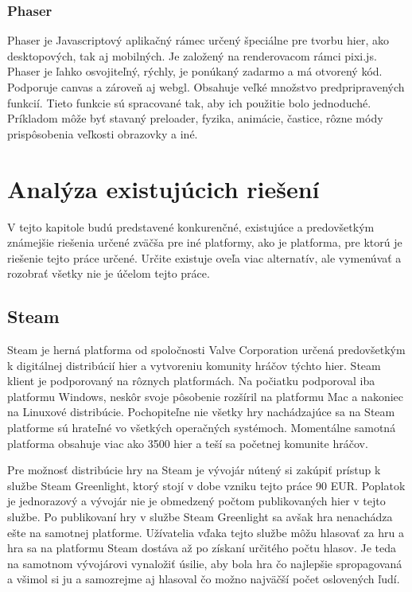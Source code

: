 \subsection{Phaser}
\label{sec:phaser}
Phaser je Javascriptový aplikačný rámec určený špeciálne pre tvorbu hier, ako desktopových, tak aj mobilných. Je založený na renderovacom rámci pixi.js. Phaser je ľahko osvojiteľný, rýchly, je ponúkaný zadarmo a má otvorený kód. Podporuje canvas a zároveň aj webgl. Obsahuje veľké množstvo predpripravených funkcií. Tieto funkcie sú spracované tak, aby ich použitie bolo jednoduché. Príkladom môže byť stavaný preloader, fyzika, animácie, častice, rôzne módy prispôsobenia veľkosti obrazovky a iné.  

\chapter{Analýza existujúcich riešení}
\label{chap:analyza}
V tejto kapitole budú predstavené konkurenčné, existujúce a predovšetkým známejšie riešenia určené zväčša pre iné platformy, ako je platforma, pre ktorú je riešenie tejto práce určené. Určite existuje oveľa viac alternatív, ale vymenúvať a rozobrať všetky nie je účelom tejto práce.

\section{Steam}
Steam je herná platforma od spoločnosti Valve Corporation určená predovšetkým k digitálnej distribúcií hier a vytvoreniu komunity hráčov týchto hier. Steam klient je podporovaný na rôznych platformách. Na počiatku podporoval iba platformu Windows, neskôr svoje pôsobenie rozšíril na platformu Mac a nakoniec na Linuxové distribúcie. Pochopiteľne nie všetky hry nachádzajúce sa na Steam platforme sú hrateľné vo všetkých operačných systémoch. Momentálne samotná platforma obsahuje viac ako 3500 hier a teší sa početnej komunite hráčov.

Pre možnosť distribúcie hry na Steam je vývojár nútený si zakúpiť prístup k službe Steam Greenlight, ktorý stojí v dobe vzniku tejto práce 90 EUR. Poplatok je jednorazový a vývojár nie je obmedzený počtom publikovaných hier v tejto službe. Po publikovaní hry v službe Steam Greenlight sa avšak hra nenachádza ešte na samotnej platforme. Užívatelia vďaka tejto službe môžu hlasovať za hru a hra sa na platformu Steam dostáva až po získaní určitého počtu hlasov. Je teda na samotnom vývojárovi vynaložiť úsilie, aby bola hra čo najlepšie spropagovaná a všimol si ju a samozrejme aj hlasoval čo možno najväčší počet oslovených ľudí. 


